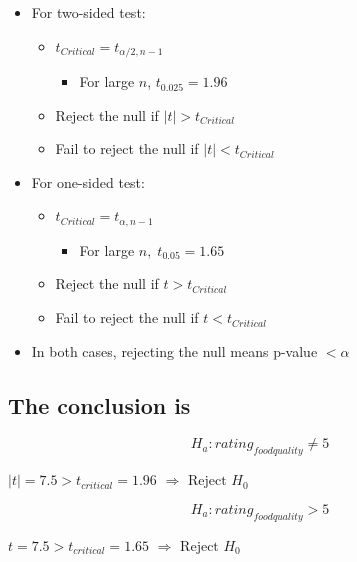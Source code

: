 \documentclass[10pt,article]{article}
\begin{document}
\begin{multicols}{2}
\begin{itemize}
\item For two-sided test:
\begin{itemize}
\item \(t_{Critical} = t_{\alpha/2, n-1}\)
\begin{itemize}
\item For large \(n\), \(t_{0.025}=1.96\)
\end{itemize}
\item Reject the null if \(|t| > t_{Critical}\)
\item Fail to reject the null if \(|t| < t_{Critical}\)
\end{itemize}
\end{itemize}

\begin{itemize}
\item For one-sided test:
\begin{itemize}
\item \(t_{Critical} = t_{\alpha, n-1}\)
\begin{itemize}
\item For large \(n, \; t_{0.05} = 1.65\)
\end{itemize}
\item Reject the null if \(t > t_{Critical}\)
\item Fail to reject the null if \(t < t_{Critical}\)
\end{itemize}
\end{itemize}
\end{multicols}

\begin{itemize}
\item In both cases, rejecting the null means p-value \(< \alpha\)
\end{itemize}

\subsection{The conclusion is}
\label{sec:orgc988b54}
\begin{multicols}{2}
\[ H_a: rating_{foodquality} \ne 5 \]

 \( |t| = 7.5 > t_{critical}=1.96 \)  \(\Rightarrow \text{ Reject } H_0 \)





\[ H_a: rating_{foodquality} > 5 \]

 \( t = 7.5 > t_{critical}=1.65 \)  \(\Rightarrow \text{ Reject } H_0 \)
\end{multicols}
\end{document}
